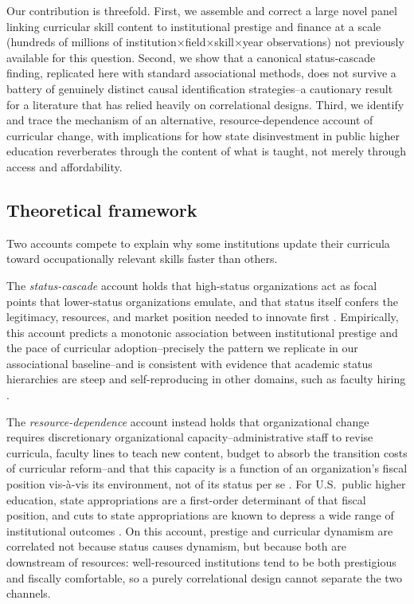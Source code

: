 \documentclass[11pt, letterpaper]{article}
\newcommand{\parencite}[1]{\cite{#1}}
\begin{document}
Our contribution is threefold. First, we assemble and correct a large novel panel linking curricular skill content to institutional prestige and finance at a scale (hundreds of millions of institution$\times$field$\times$skill$\times$year observations) not previously available for this question. Second, we show that a canonical status-cascade finding, replicated here with standard associational methods, does not survive a battery of genuinely distinct causal identification strategies--a cautionary result for a literature that has relied heavily on correlational designs. Third, we identify and trace the mechanism of an alternative, resource-dependence account \parencite{pfeffersalancik1978} of curricular change, with implications for how state disinvestment in public higher education reverberates through the content of what is taught, not merely through access and affordability.

\subsection*{Theoretical framework}

Two accounts compete to explain why some institutions update their curricula toward occupationally relevant skills faster than others.

The \emph{status-cascade} account holds that high-status organizations act as focal points that lower-status organizations emulate, and that status itself confers the legitimacy, resources, and market position needed to innovate first \parencite{podolny1993, phillipszuckerman2001, strangsoule1998}. Empirically, this account predicts a monotonic association between institutional prestige and the pace of curricular adoption--precisely the pattern we replicate in our associational baseline--and is consistent with evidence that academic status hierarchies are steep and self-reproducing in other domains, such as faculty hiring \parencite{clauset2015}.

The \emph{resource-dependence} account instead holds that organizational change requires discretionary organizational capacity--administrative staff to revise curricula, faculty lines to teach new content, budget to absorb the transition costs of curricular reform--and that this capacity is a function of an organization's fiscal position vis-\`a-vis its environment, not of its status per se \parencite{pfeffersalancik1978}. For U.S.\ public higher education, state appropriations are a first-order determinant of that fiscal position, and cuts to state appropriations are known to depress a wide range of institutional outcomes \parencite{demingwalters2017}. On this account, prestige and curricular dynamism are correlated not because status causes dynamism, but because both are downstream of resources: well-resourced institutions tend to be both prestigious and fiscally comfortable, so a purely correlational design cannot separate the two channels.
\end{document}

